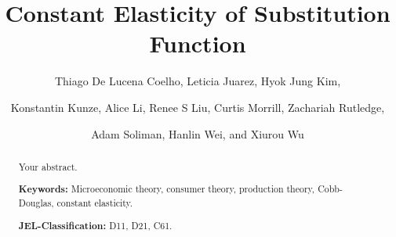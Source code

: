 \documentclass[letterpaper]{article}
\title{Constant Elasticity of Substitution Function}
\author{Thiago De Lucena Coelho, Leticia Juarez, Hyok Jung Kim, \and Konstantin Kunze,  Alice Li, Renee S Liu, Curtis Morrill, Zachariah Rutledge, \and Adam Soliman, Hanlin Wei, and Xiurou Wu}
\begin{document}
\maketitle

\begin{abstract}
Your abstract.

\vspace{0.3cm}

\noindent \textbf{Keywords: } Microeconomic theory, consumer theory, production theory, Cobb-Douglas, constant elasticity.

\vspace{0.3cm}

\noindent
\textbf{JEL-Classification: } D11, D21, C61.

\end{abstract}

\pagebreak

\tableofcontents

\pagebreak













\end{document}
